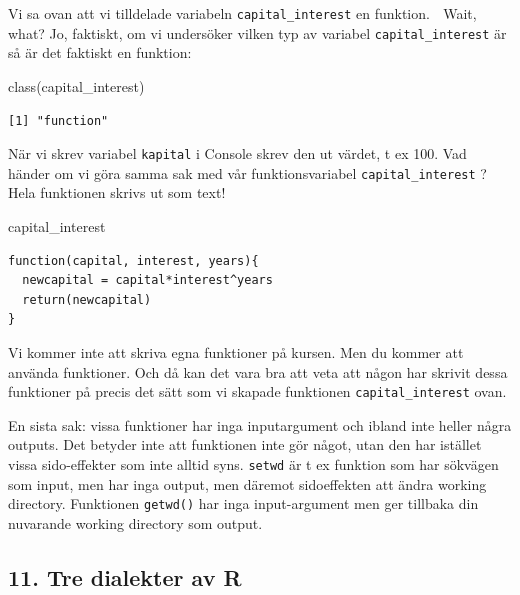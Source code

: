 \documentclass[
  letterpaper,
  DIV=11,
  numbers=noendperiod,
  oneside]{scrartcl}
\newenvironment{Shaded}{\begin{snugshade}}{\end{snugshade}}
\newcommand{\FunctionTok}[1]{\textcolor[rgb]{0.28,0.35,0.67}{#1}}
\newcommand{\NormalTok}[1]{\textcolor[rgb]{0.00,0.23,0.31}{#1}}
\begin{document}
Vi sa ovan att vi tilldelade variabeln \texttt{capital\_interest} en
funktion. 🤯 Wait, what? Jo, faktiskt, om vi undersöker vilken typ av
variabel \texttt{capital\_interest} är så är det faktiskt en funktion:

\begin{Shaded}
\begin{Highlighting}[]
\FunctionTok{class}\NormalTok{(capital\_interest)}
\end{Highlighting}
\end{Shaded}

\begin{verbatim}
[1] "function"
\end{verbatim}

När vi skrev variabel \texttt{kapital} i Console skrev den ut värdet, t
ex 100. Vad händer om vi göra samma sak med vår funktionsvariabel
\texttt{capital\_interest} ? Hela funktionen skrivs ut som text!

\begin{Shaded}
\begin{Highlighting}[]
\NormalTok{ capital\_interest }
\end{Highlighting}
\end{Shaded}

\begin{verbatim}
function(capital, interest, years){
  newcapital = capital*interest^years
  return(newcapital)
}
\end{verbatim}

Vi kommer inte att skriva egna funktioner på kursen. Men du kommer att
använda funktioner. Och då kan det vara bra att veta att någon har
skrivit dessa funktioner på precis det sätt som vi skapade funktionen
\texttt{capital\_interest} ovan.

En sista sak: vissa funktioner har inga inputargument och ibland inte
heller några outputs. Det betyder inte att funktionen inte gör något,
utan den har istället vissa sido-effekter som inte alltid syns.
\texttt{setwd} är t ex funktion som har sökvägen som input, men har inga
output, men däremot sidoeffekten att ändra working directory. Funktionen
\texttt{getwd()} har inga input-argument men ger tillbaka din nuvarande
working directory som output.

\hypertarget{tre-dialekter-av-r}{%
\subsection{11. Tre dialekter av R}\label{tre-dialekter-av-r}}
\end{document}
